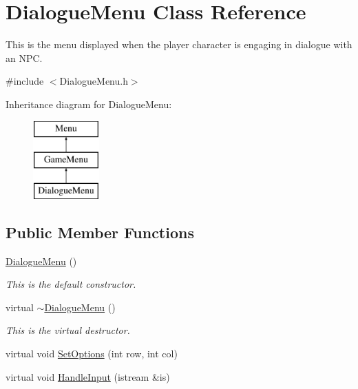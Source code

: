 \hypertarget{classDialogueMenu}{\section{Dialogue\-Menu Class Reference}
\label{classDialogueMenu}
}


This is the menu displayed when the player character is engaging in dialogue with an N\-P\-C.  




{\ttfamily \#include $<$Dialogue\-Menu.\-h$>$}

Inheritance diagram for Dialogue\-Menu\-:\begin{figure}[H]
\begin{center}
\leavevmode
\includegraphics[height=3.000000cm]{classDialogueMenu}
\end{center}
\end{figure}
\subsection*{Public Member Functions}
\begin{DoxyCompactItemize}
\item 
\hypertarget{classDialogueMenu_a062e15c446d9a559a20bfdc19fb190c5}{\hyperlink{classDialogueMenu_a062e15c446d9a559a20bfdc19fb190c5}{Dialogue\-Menu} ()}\label{classDialogueMenu_a062e15c446d9a559a20bfdc19fb190c5}

\begin{DoxyCompactList}\small\item\em This is the default constructor. \end{DoxyCompactList}\item 
\hypertarget{classDialogueMenu_a11adf9b9db3cdeca6e0c38f0beec81dc}{virtual \hyperlink{classDialogueMenu_a11adf9b9db3cdeca6e0c38f0beec81dc}{$\sim$\-Dialogue\-Menu} ()}\label{classDialogueMenu_a11adf9b9db3cdeca6e0c38f0beec81dc}

\begin{DoxyCompactList}\small\item\em This is the virtual destructor. \end{DoxyCompactList}\item 
virtual void \hyperlink{classDialogueMenu_ac6ca871d2108cea94c33ef9f97d47cfd}{Set\-Options} (int row, int col)
\item 
virtual void \hyperlink{classDialogueMenu_af682f751ddb1f30c679a19dcf6703856}{Handle\-Input} (istream \&is)
\end{DoxyCompactItemize}
